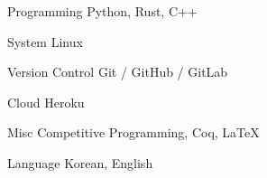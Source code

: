 

\begin{cvskills}




  \cvskill
    {Programming} %
    {Python, Rust, C++} %

  \cvskill
    {System} %
    {Linux} %

  \cvskill
    {Version Control} %
    {Git / GitHub / GitLab} %

  \cvskill
    {Cloud} %
    {Heroku} %

  \cvskill
    {Misc} %
    {Competitive Programming, Coq, LaTeX} %

  \cvskill
    {Language} %
    {Korean, English} %

\end{cvskills}
